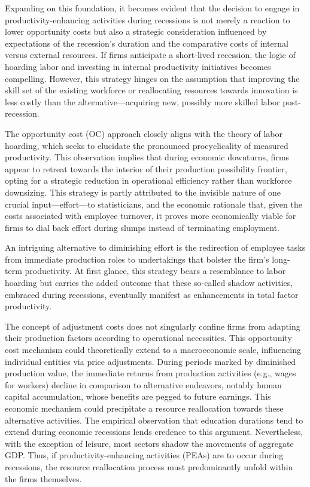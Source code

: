 \documentclass[12pt]{report}
\begin{document}
Expanding on this foundation, it becomes evident that the decision to engage in productivity-enhancing activities during
recessions is not merely a reaction to lower opportunity costs but also a strategic consideration influenced by
expectations of the recession's duration and the comparative costs of internal versus external resources. If firms
anticipate a short-lived recession, the logic of hoarding labor and investing in internal productivity initiatives
becomes compelling. However, this strategy hinges on the assumption that improving the skill set of the existing
workforce or reallocating resources towards innovation is less costly than the alternative—acquiring new, possibly more
skilled labor post-recession. 

The opportunity cost (OC) approach closely aligns with the theory of labor hoarding, which seeks to elucidate the
pronounced procyclicality of measured productivity. This observation implies that during economic downturns, firms
appear to retreat towards the interior of their production possibility frontier, opting for a strategic reduction in
operational efficiency rather than workforce downsizing. This strategy is partly attributed to the invisible nature of
one crucial input—effort—to statisticians, and the economic rationale that, given the costs associated with employee
turnover, it proves more economically viable for firms to dial back effort during slumps instead of terminating
employment. 

An intriguing alternative to diminishing effort is the redirection of employee tasks from immediate production roles to
undertakings that bolster the firm's long-term productivity. At first glance, this strategy bears a resemblance to labor
hoarding but carries the added outcome that these so-called shadow activities, embraced during recessions, eventually
manifest as enhancements in total factor productivity. 

The concept of adjustment costs does not singularly confine firms from adapting their production factors according to
operational necessities. This opportunity cost mechanism could theoretically extend to a macroeconomic scale,
influencing individual entities via price adjustments. During periods marked by diminished production value, the
immediate returns from production activities (e.g., wages for workers) decline in comparison to alternative endeavors,
notably human capital accumulation, whose benefits are pegged to future earnings. This economic mechanism could
precipitate a resource reallocation towards these alternative activities. The empirical observation that education
durations tend to extend during economic recessions lends credence to this argument. Nevertheless, with the exception of
leisure, most sectors shadow the movements of aggregate GDP. Thus, if productivity-enhancing activities (PEAs) are to
occur during recessions, the resource reallocation process must predominantly unfold within the firms themselves. 
\end{document}
